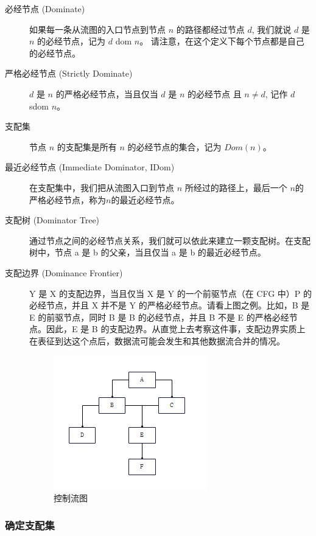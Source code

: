 \begin{description}
    \item[必经节点 (Dominate)]
    如果每一条从流图的入口节点到节点 $n$ 的路径都经过节点 $d$, 我们就说 $d$ 是 $n$ 的必经节点，记为 $d$ dom $n$。
    请注意，在这个定义下每个节点都是自己的必经节点。

    \item[严格必经节点 (Strictly Dominate)]
    $d$ 是 $n$ 的严格必经节点，当且仅当 $d$ 是 $n$ 的必经节点 且 $n\neq d$, 记作 $d$ sdom $n$。

    \item[支配集]
    节点 $n$ 的支配集是所有 $n$ 的必经节点的集合，记为 $\mathit{Dom}(n)$。

    \item[最近必经节点 (Immediate Dominator, IDom)]
    在支配集中，我们把从流图入口到节点 $n$ 所经过的路径上，最后一个 $n$的严格必经节点，称为$n$的最近必经节点。

    \item[支配树 (Dominator Tree)]
    通过节点之间的必经节点关系，我们就可以依此来建立一颗支配树。在支配树中，节点 a 是 b 的父亲，当且仅当 a 是 b 的最近必经节点。

    \item[支配边界 (Dominance Frontier)]
    Y 是 X 的支配边界，当且仅当 X 是 Y 的一个前驱节点（在 CFG 中）P 的必经节点，并且 X 并不是 Y 的严格必经节点。请看上图之例。比如，B 是 E 的前驱节点，同时 B 是 B 的必经节点，并且 B 不是 E 的严格必经节点。因此，E 是 B 的支配边界。从直觉上去考察这件事，支配边界实质上在表征到达这个点后，数据流可能会发生和其他数据流合并的情况。
    \begin{figure}
        \centering
        \includegraphics[width=0.5\linewidth]{CTG.jpg}
        \caption{控制流图}
        \label{fig:enter-label}
    \end{figure}
\end{description}

\subsubsection{确定支配集}

